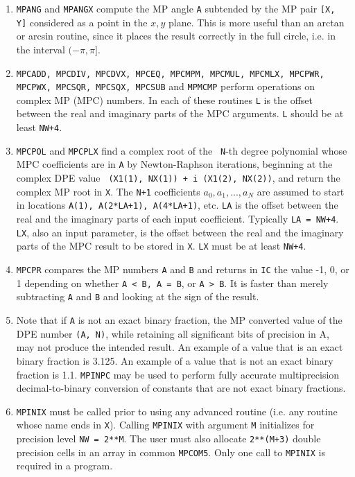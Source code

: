 \begin{enumerate}

\item {\tt MPANG} and {\tt MPANGX} compute the MP angle {\tt A}
subtended by the MP pair {\tt [X, Y]} considered as a point in the
$x,y$ plane.  This is more useful than an arctan or arcsin routine,
since it places the result correctly in the full circle, i.e. in the
interval $(-\pi, \pi]$.

\item {\tt MPCADD, MPCDIV, MPCDVX, MPCEQ, MPCMPM, MPCMUL, MPCMLX,
MPCPWR, MPCPWX, MPCSQR, MPCSQX, MPCSUB} and {\tt MPMCMP} perform
operations on complex MP (MPC) numbers.  In each of these routines
{\tt L} is the offset between the real and imaginary parts of the MPC
arguments.  {\tt L} should be at least {\tt NW+4}.

\item {\tt MPCPOL} and {\tt MPCPLX} find a complex root of the {\tt
N}-th degree polynomial whose MPC coefficients are in {\tt A} by
Newton-Raphson iterations, beginning at the complex DPE value {\tt
(X1(1), NX(1)) + i (X1(2), NX(2))}, and return the complex MP root in
{\tt X}.  The {\tt N+1} coefficients $a_0, a_1, ..., a_N$ are assumed
to start in locations {\tt A(1), A(2*LA+1), A(4*LA+1)}, etc.  {\tt LA}
is the offset between the real and the imaginary parts of each input
coefficient.  Typically {\tt LA = NW+4}.  {\tt LX}, also an input
parameter, is the offset between the real and the imaginary parts of
the MPC result to be stored in {\tt X}.  {\tt LX} must be at least
{\tt NW+4}.

\item {\tt MPCPR} compares the MP numbers {\tt A} and {\tt B} and
returns in {\tt IC} the value -1, 0, or 1 depending on whether {\tt A
< B, A = B}, or {\tt A > B}.  It is faster than merely subtracting
{\tt A} and {\tt B} and looking at the sign of the result.

\item Note that if {\tt A} is not an exact binary fraction, the MP
converted value of the DPE number {\tt (A, N)}, while retaining all
significant bits of precision in A, may not produce the intended
result.  An example of a value that is an exact binary fraction is
3.125.  An example of a value that is not an exact binary fraction is
1.1.  {\tt MPINPC} may be used to perform fully accurate
multiprecision decimal-to-binary conversion of constants that are not
exact binary fractions.

\item {\tt MPINIX} must be called prior to using any advanced routine
(i.e.  any routine whose name ends in {\tt X}).  Calling {\tt MPINIX}
with argument {\tt M} initializes for precision level {\tt NW = 2**M}.
The user must also allocate {\tt 2**(M+3)} double precision cells in
an array in common {\tt MPCOM5}.  Only one call to {\tt MPINIX} is
required in a program.


\end{enumerate}

